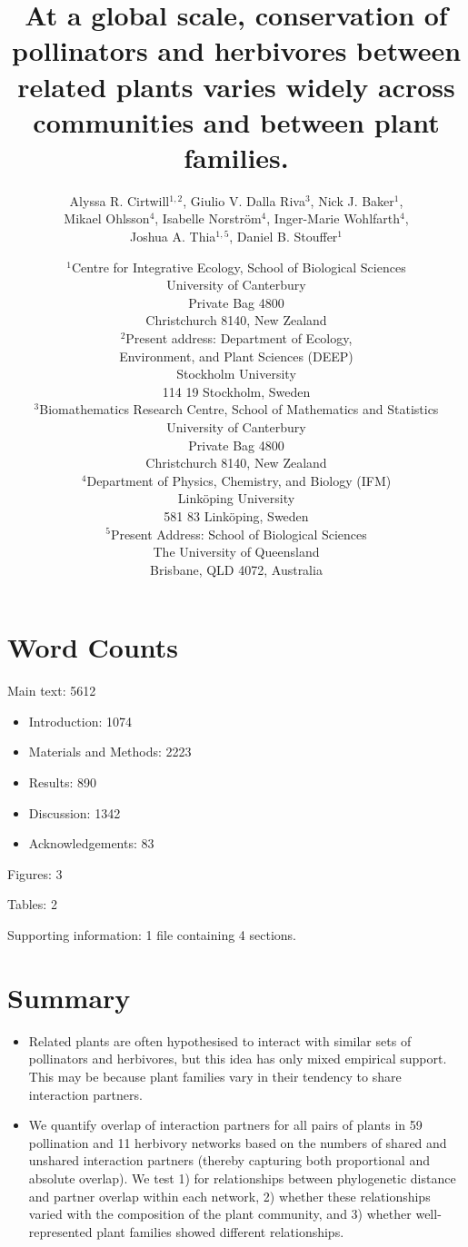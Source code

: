 \documentclass[12pt]{article}
\title{At a global scale, conservation of pollinators and herbivores between related plants varies widely across communities and between plant families.}
[[Title bad, vague, needs replacing.]]
\author{Alyssa R. Cirtwill$^{1,2}$, Giulio V. Dalla Riva$^{3}$, Nick J. Baker$^{1}$,\\
Mikael Ohlsson$^{4}$, Isabelle Norstr\"{o}m$^{4}$, Inger-Marie Wohlfarth$^{4}$,\\ %
Joshua A. Thia$^{1,5}$, %
Daniel B. Stouffer$^{1}$}
\date{\small$^1$Centre for Integrative Ecology, School of Biological Sciences\\University of Canterbury\\Private Bag 4800\\
Christchurch 8140, New Zealand\\
\medskip$^2$Present address: Department of Ecology,\\
Environment, and Plant Sciences (DEEP)\\
Stockholm University\\
114 19 Stockholm, Sweden\\
\medskip$^3$Biomathematics Research Centre, School of Mathematics and Statistics\\
University of Canterbury\\Private Bag 4800\\
Christchurch 8140, New Zealand\\
\medskip$^4$Department of Physics, Chemistry, and Biology (IFM)\\ Link\"{o}ping University\\ 581 83 Link\"{o}ping, Sweden\\
\medskip$^5$Present Address: School of Biological Sciences\\
The University of Queensland\\Brisbane, QLD 4072, Australia }
\begin{document}
\maketitle
\baselineskip=8.5mm
\begin{spacing}{1.0}

\section*{Word Counts}

Main text: 5612 %

\begin{itemize}
  \item Introduction: 1074
  \item Materials and Methods: 2223 
  \item Results: 890
  \item Discussion: 1342
  \item Acknowledgements: 83
\end{itemize}



Figures: 3


Tables: 2


Supporting information: 1 file containing 4 sections.


\vspace{0.4 in}

\section*{Summary} %

  \begin{itemize}
    \item Related plants are often hypothesised to interact with similar sets of pollinators and herbivores, but this idea has only mixed empirical support. This may be because plant families vary in their tendency to share interaction partners.

    \item We quantify overlap of interaction partners for all pairs of plants in 59 pollination and 11 herbivory networks based on the numbers of shared and unshared interaction partners (thereby capturing both proportional and absolute overlap). We test 1) for relationships between phylogenetic distance and partner overlap within each network, 2) whether these relationships varied with the composition of the plant community, and 3) whether well-represented plant families showed different relationships. 
 

\end{itemize}
\end{spacing}
\end{document}

